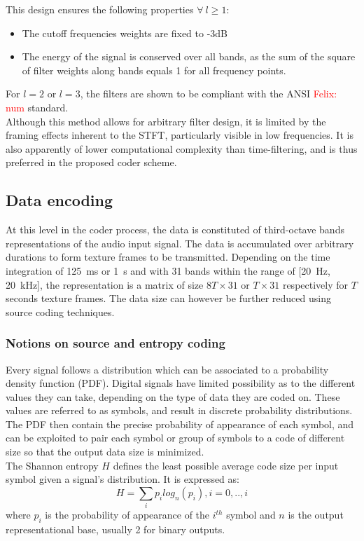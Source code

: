 \documentclass[12pt,times,onecolumn]{article}
\newcommand{\fg}[1]{\textcolor{red}{ Felix: #1}}
\begin{document}
\noindent This design ensures the following properties $\forall~l\geq 1$:
\begin{itemize}
\item The cutoff frequencies weights are fixed to -3dB
\item The energy of the signal is conserved over all bands, as the sum of the square of filter weights along bands equals 1 for all frequency points.
\end{itemize}
For $l = 2$ or $l = 3$, the filters are shown to be compliant with the ANSI\fg{num} standard.\\

Although this method allows for arbitrary filter design, it is limited by the framing effects inherent to the STFT, particularly visible in low frequencies. It is also apparently of lower computational complexity than time-filtering, and is thus preferred in the proposed coder scheme.

\subsection{Data encoding}
At this level in the coder process, the data is constituted of third-octave bands representations of the audio input signal. The data is accumulated over arbitrary durations to form texture frames to be transmitted. Depending on the time integration of 125~ms or 1~s and with 31 bands within the range of [20~Hz, 20~kHz], the representation is a matrix of size $8T\times 31$ or $T\times 31$ respectively for $T$ seconds texture frames. The data size can however be further reduced using source coding techniques.

\subsubsection{Notions on source and entropy coding}
Every signal follows a distribution which can be associated to a probability density function (PDF). Digital signals have limited possibility as to the different values they can take, depending on the type of data they are coded on. These values are referred to as symbols, and result in discrete probability distributions. The PDF then contain the precise probability of appearance of each symbol, and can be exploited to pair each symbol or group of symbols to a code of different size so that the output data size is minimized.\\

The Shannon entropy $H$ defines the least possible average code size per input symbol given a signal's distribution. It is expressed as:
\begin{equation}
H = \sum\limits_i p_ilog_n(p_i), i = 0,..,i
\end{equation}
where $p_i$ is the probability of appearance of the $i^{th}$ symbol and $n$ is the output representational base, usually 2 for binary outputs.
\end{document}
